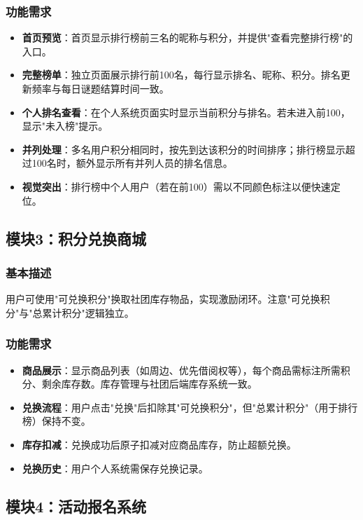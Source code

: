 \documentclass[a4paper,12pt]{article}
\begin{document}
\subsubsection{功能需求}
\begin{itemize}
    \item \textbf{首页预览}：首页显示排行榜前三名的昵称与积分，并提供"查看完整排行榜"的入口。
    \item \textbf{完整榜单}：独立页面展示排行前100名，每行显示排名、昵称、积分。排名更新频率与每日谜题结算时间一致。
    \item \textbf{个人排名查看}：在个人系统页面实时显示当前积分与排名。若未进入前100，显示"未入榜"提示。
    \item \textbf{并列处理}：多名用户积分相同时，按先到达该积分的时间排序；排行榜显示超过100名时，额外显示所有并列人员的排名信息。
    \item \textbf{视觉突出}：排行榜中个人用户（若在前100）需以不同颜色标注以便快速定位。
\end{itemize}

\subsection{模块3：积分兑换商城}
\subsubsection{基本描述}
用户可使用"可兑换积分"换取社团库存物品，实现激励闭环。注意"可兑换积分"与"总累计积分"逻辑独立。

\subsubsection{功能需求}
\begin{itemize}
    \item \textbf{商品展示}：显示商品列表（如周边、优先借阅权等），每个商品需标注所需积分、剩余库存数。库存管理与社团后端库存系统一致。
    \item \textbf{兑换流程}：用户点击"兑换"后扣除其"可兑换积分"，但"总累计积分"（用于排行榜）保持不变。
    \item \textbf{库存扣减}：兑换成功后原子扣减对应商品库存，防止超额兑换。
    \item \textbf{兑换历史}：用户个人系统需保存兑换记录。
\end{itemize}

\subsection{模块4：活动报名系统}
\end{document}
